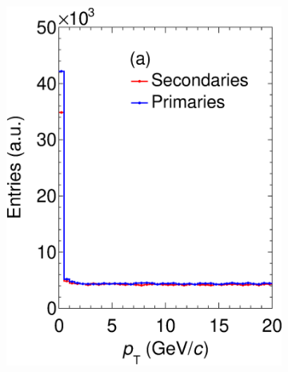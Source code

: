 \begin{figure}[t]
     \centering
     \begin{subfigure}[b]{0.32\textwidth}
         \centering
         \includegraphics[width=\textwidth]{figures/ch5-KF_NDGAr/ToySample/testTPCMirrorpTAllTall.eps}
         \caption{}
         \label{fig:ptTPC}
     \end{subfigure}
     \begin{subfigure}[b]{0.32\textwidth}
         \centering

\end{subfigure}
\end{figure}
